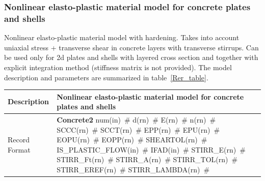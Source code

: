 \documentclass[a4paper]{article}
\newcommand{\descitem}[1]{{\noindent \bf #1}}
\newcommand{\elemparam}[2]{{{#1\tiny (#2)}~\#}}
\begin{document}
\subsubsection{Nonlinear elasto-plastic material model for concrete
plates and shells}
\label{Rer}
Nonlinear elasto-plastic material model with hardening.
Takes into account uniaxial stress + transverse shear in concrete
layers with transverse stirrups.
Can be used only for 2d plates and shells with layered cross section
and together with explicit integration method (stiffness matrix is not
provided).
The model description and parameters are summarized
in table~\ref{Rer_table}.

\begin{table}[!htb]
\begin{tabular}{|l|p{9cm}|}
\hline
Description & Nonlinear elasto-plastic material model for concrete
plates and shells\\
\hline
Record Format & \descitem{Concrete2} \elemparam{num}{in}
\elemparam{d}{rn} \elemparam{E}{rn} \elemparam{n}{rn}
\elemparam{SCCC}{rn} \elemparam{SCCT}{rn} \elemparam{EPP}{rn} \elemparam{EPU}{rn}
\elemparam{EOPU}{rn} \elemparam{EOPP}{rn} \elemparam{SHEARTOL}{rn}
\elemparam{IS\_PLASTIC\_FLOW}{in} \elemparam{IFAD}{in} \elemparam{STIRR\_E}{rn} \elemparam{STIRR\_Ft}{rn}
\elemparam{STIRR\_A}{rn} \elemparam{STIRR\_TOL}{rn} \elemparam{STIRR\_EREF}{rn}
\elemparam{STIRR\_LAMBDA}{rn}\\


\end{tabular}
\end{table}
\end{document}
